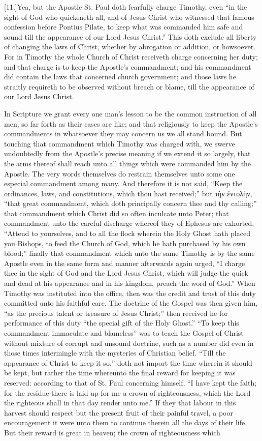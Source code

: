 [11.]Yea, but the Apostle St. Paul doth fearfully charge Timothy, even “in the sight of God who quickeneth all,  and of Jesus Christ who witnessed that famous confession before Pontius Pilate, to keep what was commanded him safe and sound till the appearance of our Lord Jesus Christ.” This doth exclude all liberty of changing the laws of Christ, whether by abrogation or addition, or howsoever. For in Timothy the whole Church of Christ receiveth charge concerning her duty; and that charge is to keep the Apostle’s commandment; and his commandment did contain the laws that concerned church government; and those laws he straitly requireth to be observed without breach or blame, till the appearance of our Lord Jesus Christ.

In Scripture we grant every one man’s lesson to be the common instruction of all men, so far forth as their cases are like; and that religiously to keep the Apostle’s commandments in whatsoever they may concern us we all stand bound. But touching that commandment which Timothy was charged with, we swerve undoubtedly from the Apostle’s precise meaning if we extend it so largely, that the arms thereof shall reach unto all things which were commanded him by the Apostle. The very words themselves do restrain themselves unto some one especial commandment among many. And therefore it is not said, “Keep the ordinances, laws, and constitutions, which thou hast received;” but τὴν ἐντολὴν, “that great commandment, which doth principally concern thee and thy calling;” that commandment which Christ did so often inculcate unto Peter; that commandment unto the careful discharge whereof they of Ephesus are exhorted, “Attend to yourselves, and to all the flock wherein the Holy Ghost hath placed you Bishops, to feed the Church of God, which he hath purchased by his own blood;” finally that commandment which unto the same Timothy is by the same Apostle even in the same form and manner afterwards again urged, “I charge thee in the sight of God and the Lord Jesus Christ, which will judge the quick and dead at his appearance and in his kingdom, preach the word of God.”  When Timothy was instituted into the office, then was the credit and trust of this duty committed unto his faithful care. The doctrine of the Gospel was then given him, “as the precious talent or treasure of Jesus Christ;” then received he for performance of this duty “the special gift of the Holy Ghost.” “To keep this commandment immaculate and blameless” was to teach the Gospel of Christ without mixture of corrupt and unsound doctrine, such as a number did even in those times intermingle with the mysteries of Christian belief. “Till the appearance of Christ to keep it so,” doth not import the time wherein it should be kept, but rather the time whereunto the final reward for keeping it was reserved: according to that of St. Paul concerning himself, “I have kept the faith; for the residue there is laid up for me a crown of righteousness, which the Lord the righteous shall in that day render unto me.” If they that labour in this harvest should respect but the present fruit of their painful travel, a poor encouragement it were unto them to continue therein all the days of their life. But their reward is great in heaven; the crown of righteousness which 